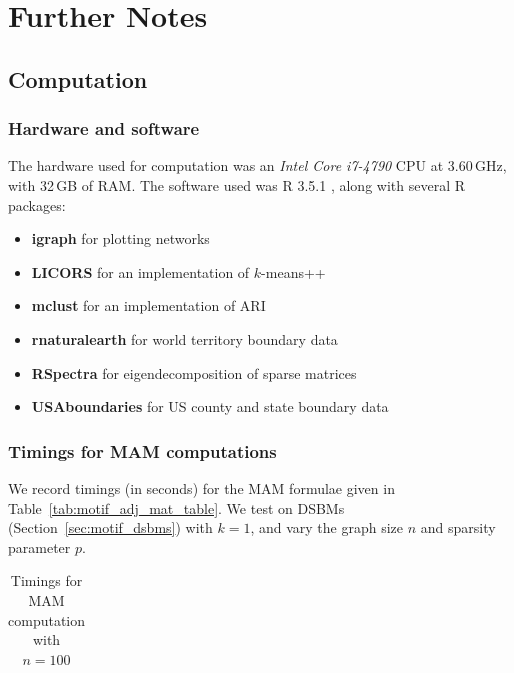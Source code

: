 \chapter{Further Notes}








\section{Computation} \label{sec:notes_computation}


\subsection{Hardware and software} \label{sec:notes_hardware}

The hardware used for computation was an \emph{Intel Core i7-4790} CPU at 3.60\,GHz, with 32\,GB of RAM. The software used was R 3.5.1 \cite{r_rsoftware}, along with several R packages:
%
%
\begin{itemize}
	\item \textbf{igraph} \cite{r_igraph} for plotting networks
	\item \textbf{LICORS} \cite{r_LICORS} for an implementation of $k$-means++
	\item \textbf{mclust} \cite{r_mclust} for an implementation of ARI
	\item \textbf{rnaturalearth} \cite{r_rnaturalearth} for world territory boundary data
	\item \textbf{RSpectra} \cite{r_RSpectra} for eigendecomposition of sparse matrices
	\item \textbf{USAboundaries} \cite{r_USAboundaries} for US county and state boundary data
\end{itemize}






\subsection{Timings for MAM computations} \label{sec:notes_timing}

We record timings (in seconds) for the MAM formulae given in Table~\ref{tab:motif_adj_mat_table}. We test on DSBMs (Section~\ref{sec:motif_dsbms}) with $k=1$, and vary the graph size $n$ and sparsity parameter $p$.

\vspace*{0.3cm}
\begin{table}[H]
\centering
\renewcommand{\arraystretch}{1.5}
\setlength\tabcolsep{0.2em}
\scriptsize
	\begin{tabular}{ |c|c|c|c|c|c|c|c|c|c|c|c|c|c|c|c|c|c| }
		\hline	
		
	\end{tabular}
	\caption{Timings for MAM computation with $n=100$}
	\label{tab:timing_n_100}
\end{table}



